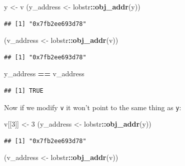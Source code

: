 \documentclass[]{book}
\newenvironment{Shaded}{\begin{snugshade}}{\end{snugshade}}
\newcommand{\DecValTok}[1]{\textcolor[rgb]{0.00,0.00,0.81}{#1}}
\newcommand{\KeywordTok}[1]{\textcolor[rgb]{0.13,0.29,0.53}{\textbf{#1}}}
\newcommand{\NormalTok}[1]{#1}
\newcommand{\OperatorTok}[1]{\textcolor[rgb]{0.81,0.36,0.00}{\textbf{#1}}}
\newcommand{\StringTok}[1]{\textcolor[rgb]{0.31,0.60,0.02}{#1}}
\begin{document}
\begin{Shaded}
\begin{Highlighting}[]
\NormalTok{y <-}\StringTok{ }\NormalTok{v}
\NormalTok{(y_address <-}\StringTok{ }\NormalTok{lobstr}\OperatorTok{::}\KeywordTok{obj_addr}\NormalTok{(y))}
\end{Highlighting}
\end{Shaded}

\begin{verbatim}
## [1] "0x7fb2ee693d78"
\end{verbatim}

\begin{Shaded}
\begin{Highlighting}[]
\NormalTok{(v_address <-}\StringTok{ }\NormalTok{lobstr}\OperatorTok{::}\KeywordTok{obj_addr}\NormalTok{(v))}
\end{Highlighting}
\end{Shaded}

\begin{verbatim}
## [1] "0x7fb2ee693d78"
\end{verbatim}

\begin{Shaded}
\begin{Highlighting}[]
\NormalTok{y_address }\OperatorTok{==}\StringTok{ }\NormalTok{v_address}
\end{Highlighting}
\end{Shaded}

\begin{verbatim}
## [1] TRUE
\end{verbatim}

Now if we modify \texttt{v} it won't point to the same thing as \texttt{y}:

\begin{Shaded}
\begin{Highlighting}[]
\NormalTok{v[[}\DecValTok{3}\NormalTok{]] <-}\StringTok{ }\DecValTok{3}
\NormalTok{(y_address <-}\StringTok{ }\NormalTok{lobstr}\OperatorTok{::}\KeywordTok{obj_addr}\NormalTok{(y))}
\end{Highlighting}
\end{Shaded}

\begin{verbatim}
## [1] "0x7fb2ee693d78"
\end{verbatim}

\begin{Shaded}
\begin{Highlighting}[]
\NormalTok{(v_address <-}\StringTok{ }\NormalTok{lobstr}\OperatorTok{::}\KeywordTok{obj_addr}\NormalTok{(v))}
\end{Highlighting}
\end{Shaded}
\end{document}
